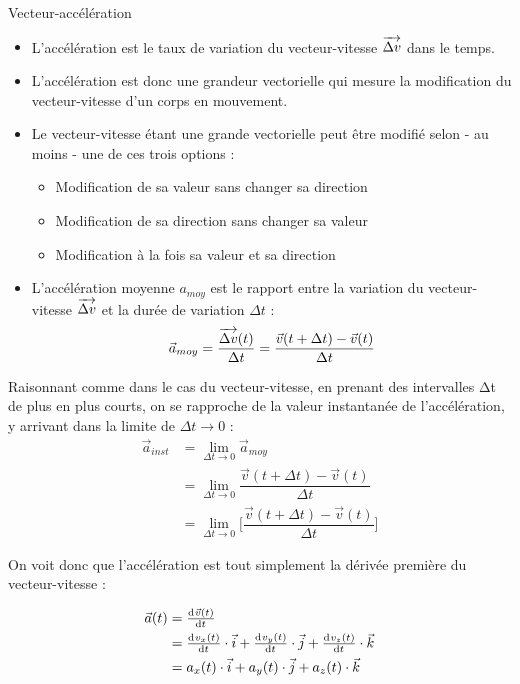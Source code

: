 \documentclass[11pt,a4paper]{article}
\begin{document}
\begin{defn}{Vecteur-accélération}
\begin{itemize}
    \item L’accélération est le taux de variation du vecteur-vitesse $ \overrightarrow{\Delta v} $ dans le temps.
    \item L’accélération est donc une grandeur vectorielle qui mesure la modification du vecteur-vitesse d’un corps en mouvement.
    \item Le vecteur-vitesse étant une grande vectorielle peut être modifié selon - au moins - une de ces trois options :
    \begin{itemize}
        \item Modification de sa valeur sans changer sa direction
        \item Modification de sa direction sans changer sa valeur
        \item Modification à la fois sa valeur et sa direction
    \end{itemize}
    \item L’accélération moyenne $a_{moy}$ est le rapport entre la variation du vecteur-vitesse $ \overrightarrow{\Delta v} $ et la durée de variation $\Delta t$ : 
    \[
    \vec{a}_{moy} = \dfrac{\overrightarrow{\Delta v}(t) }{\Delta t} = \dfrac{\vec{v}(t + \Delta t) - \vec{v}(t)}{\Delta t} 
    \]
\end{itemize}
\end{defn}
\endgroup

Raisonnant comme dans le cas du vecteur-vitesse, en prenant des intervalles Δt de plus en plus courts, on se rapproche de la valeur instantanée de l'accélération, y arrivant dans la limite de $\Delta t \rightarrow 0 $ : 
\begin{align*}
    \Vec{a}_{inst} &= \lim_{\Delta t \to 0} \Vec{a}_{moy} \\ 
    &= \lim_{\Delta t \to 0} \dfrac{\Vec{v}(t + \Delta t) - \Vec{v}(t)}{\Delta t} \\
    &= \lim_{\Delta t \to 0} \Bigg[ \dfrac{\Vec{v}(t + \Delta t) - \Vec{v}(t)}{\Delta t} \Bigg]
\end{align*}

On voit donc que l'accélération est tout simplement la dérivée première du vecteur-vitesse : 

\begin{align*}
    \Vec{a}(t) &= \od{\Vec{v}(t)}{t} \\
    &= \od{v_x(t)}{t}\cdot \Vec{i} + \od{v_y(t)}{t}\cdot \Vec{j} + \od{v_z(t)}{t}\cdot \Vec{k} \\
    &= a_x(t)\cdot \Vec{i} + a_y(t)\cdot \Vec{j} + a_z(t)\cdot \Vec{k}
\end{align*}
\end{document}
